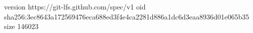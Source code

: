 version https://git-lfs.github.com/spec/v1
oid sha256:3ec8643a172569476eca688ed3f4e4ca2281d886a1dc6d3eaa8936d01e065b35
size 146023
